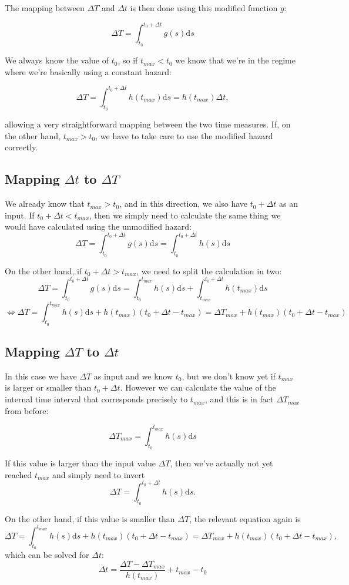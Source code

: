 \documentclass[a4paper,11pt]{article}
\newcommand{\ud}{\mathrm{d}}
\newcommand{\mpt}{\mathrm{.}}
\newcommand{\mcm}{\mathrm{,}}
\begin{document}
		The mapping between $\Delta T$ and $\Delta t$ is then done using this modified function $g$:

		\[ \Delta T = \int_{t_0}^{t_0+\Delta t} g(s) \ud s \]

		We always know the value of $t_0$, so if $t_{max} < t_0$ we know that we're in the regime where
		we're basically using a constant hazard:

		\[ \Delta T = \int_{t_0}^{t_0+\Delta t} h(t_{max}) \ud s = h(t_{max}) \Delta t \mcm \]

		allowing a very straightforward mapping between the two time measures.
		If, on the other hand, $t_{max} > t_0$, we have to take care to use the modified hazard correctly.

		\subsection{Mapping $\Delta t$ to $\Delta T$}

			We already know that $t_{max} > t_0$, and in this direction, we also have $t_0 + \Delta t$ as
			an input. If $t_0 + \Delta t < t_{max}$, then we simply need to calculate the same thing we
			would have calculated using the unmodified hazard:
			\[ \Delta T = \int_{t_0}^{t_0+\Delta t} g(s) \ud s 
			            = \int_{t_0}^{t_0+\Delta t} h(s) \ud s \]

			On the other hand, if $t_0 + \Delta t > t_{max}$, we need to split the calculation in two:
			\[ \Delta T = \int_{t_0}^{t_0+\Delta t} g(s) \ud s 
			            = \int_{t_0}^{t_{max}} h(s) \ud s + \int_{t_{max}}^{t_0 + \Delta t} h(t_{max}) \ud s \]
			\[ \Leftrightarrow \Delta T = \int_{t_0}^{t_{max}} h(s) \ud s + h(t_{max}) ( t_0 + \Delta t - t_{max} ) 
			                            = \Delta T_{max} + h(t_{max}) ( t_0 + \Delta t - t_{max} ) \]

		\subsection{Mapping $\Delta T$ to $\Delta t$}

			In this case we have $\Delta T$ as input and we know $t_0$, but we don't know yet if $t_{max}$
			is larger or smaller than $t_0 + \Delta t$. However we can calculate the value of the internal time
			interval that corresponds precisely to $t_{max}$, and this is in fact $\Delta T_{max}$ from
			before:
			
			\[ \Delta T_{max} = \int_{t_0}^{t_{max}} h(s) \ud s \]

			If this value is larger than the input value $\Delta T$, then we've actually not yet reached $t_{max}$
			and simply need to invert 
			\[ \Delta T = \int_{t_0}^{t_0+\Delta t} h(s) \ud s \mpt \]

			On the other hand, if this value is smaller than $\Delta T$, the relevant equation again is
			\[ \Delta T = \int_{t_0}^{t_{max}} h(s) \ud s + h(t_{max}) ( t_0 + \Delta t - t_{max} ) 
			            = \Delta T_{max} + h(t_{max}) ( t_0 + \Delta t - t_{max} ) \mcm \]
			which can be solved for $\Delta t$:
			\[ \Delta t = \frac{\Delta T - \Delta T_{max}}{h(t_{max})} + t_{max} - t_0 \]
\end{document}
